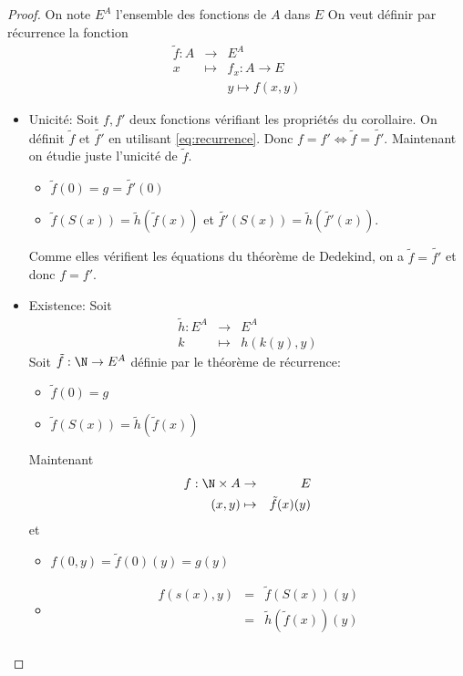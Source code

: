 \begin{proof}
	On note $E^A$ l'ensemble des fonctions de $A$ dans $E$
	On veut définir par récurrence la fonction
	\begin{eqnarray} \label{eq:recurrence}
		\tilde{f} : A & \to     & E^A   \\
		x             & \mapsto & f_x : A \to E    \nonumber \\
		&         & y \mapsto f(x,y) \nonumber
	\end{eqnarray}
	\begin{itemize}
		\item Unicité: Soit $f,f'$ deux fonctions vérifiant les propriétés du corollaire. On définit $\tilde{f}$ et $\tilde{f'}$ en utilisant \ref{eq:recurrence}.
		      Donc $f = f' \iff \tilde{f} = \tilde{f'}$.
		      Maintenant on étudie juste l'unicité de $\tilde{f}$.
		      \begin{itemize}
			      \item  $ \tilde{f}(0) = g = \tilde{f'}(0)$
			      \item $ \tilde{f}(S(x)) = \tilde{h}(\tilde{f}(x))$ et $ \tilde{f'}(S(x)) = \tilde{h}(\tilde{f'}(x))$.
		      \end{itemize}
		      Comme elles vérifient les équations du théorème de Dedekind, on a $\tilde{f} = \tilde{f'}$ et donc $f = f'$.
		\item Existence: Soit \begin{eqnarray*}
			      \tilde{h}: E^A & \to & E^A \\
			      k & \mapsto & h(k(y),y)
		      \end{eqnarray*}
		      Soit $\tilde{f} : \N \to E^A$ définie par le théorème de récurrence:
		      \begin{itemize}
			      \item $\tilde{f}(0) = g$
			      \item $\tilde{f}(S(x)) = \tilde{h}(\tilde{f}(x))$
		      \end{itemize}
		      Maintenant \begin{eqnarray*}
			      f : \N \times A & \to & E \\
			      (x,y) & \mapsto & \tilde{f}(x)(y)
		      \end{eqnarray*}
		      et \begin{itemize}
			      \item $f(0,y) = \tilde{f}(0)(y) = g(y)$
			      \item \begin{eqnarray*}
				            f(s(x),y) & = & \tilde{f}(S(x))(y) \\
				            & = & \tilde{h}(\tilde{f}(x))(y) \\
			            \end{eqnarray*}
		      \end{itemize}
	\end{itemize}
\end{proof}


